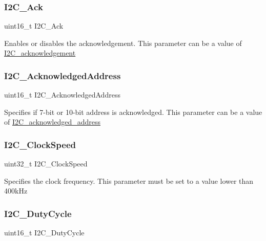 \subsubsection{\texorpdfstring{I2C\_Ack}{I2C\_Ack}}
{\footnotesize\ttfamily uint16\+\_\+t I2\+C\+\_\+\+Ack}

Enables or disables the acknowledgement. This parameter can be a value of \mbox{\hyperlink{group___i2_c__acknowledgement}{I2\+C\+\_\+acknowledgement}} \mbox{\label{struct_i2_c___init_type_def_af46be2bc866a7dbf0d529dd770b105b3}} 
\subsubsection{\texorpdfstring{I2C\_AcknowledgedAddress}{I2C\_AcknowledgedAddress}}
{\footnotesize\ttfamily uint16\+\_\+t I2\+C\+\_\+\+Acknowledged\+Address}

Specifies if 7-\/bit or 10-\/bit address is acknowledged. This parameter can be a value of \mbox{\hyperlink{group___i2_c__acknowledged__address}{I2\+C\+\_\+acknowledged\+\_\+address}} \mbox{\label{struct_i2_c___init_type_def_af8d72d15cd29b7e69591ce3edab497f6}} 
\subsubsection{\texorpdfstring{I2C\_ClockSpeed}{I2C\_ClockSpeed}}
{\footnotesize\ttfamily uint32\+\_\+t I2\+C\+\_\+\+Clock\+Speed}

Specifies the clock frequency. This parameter must be set to a value lower than 400k\+Hz \mbox{\label{struct_i2_c___init_type_def_a349afc2bb8534c072349a6061f29344a}} 
\subsubsection{\texorpdfstring{I2C\_DutyCycle}{I2C\_DutyCycle}}
{\footnotesize\ttfamily uint16\+\_\+t I2\+C\+\_\+\+Duty\+Cycle}

